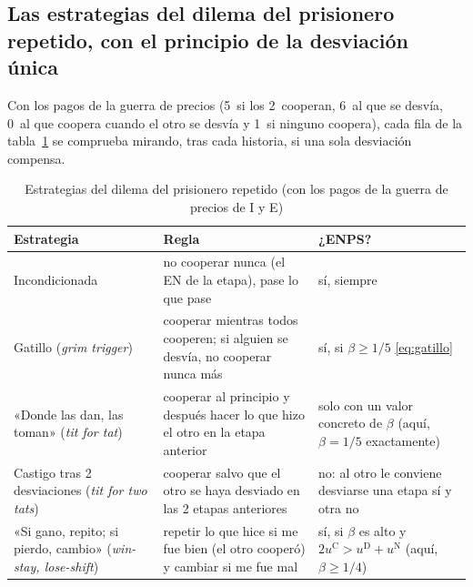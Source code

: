 \documentclass[11pt]{article}
\begin{document}
\subsection*{Las estrategias del dilema del prisionero repetido, con el principio de la desviación única}

Con los pagos de la guerra de precios (5~si los 2~cooperan, 6~al que se desvía, 0~al que coopera cuando el otro se desvía y 1~si ninguno coopera), cada fila de la tabla~\ref{tab:estrategias-repetidas} se comprueba mirando, tras cada historia, si una sola desviación compensa.

\begin{table}[H]
\centering
\caption{Estrategias del dilema del prisionero repetido (con los pagos de la guerra de precios de \textup{I} y E)}\label{tab:estrategias-repetidas}
\begin{tabular}{>{\raggedright\arraybackslash}m{3.8cm}>{\raggedright\arraybackslash}m{6.2cm}>{\centering\arraybackslash}m{4.4cm}}
\toprule
\rowcolor{tceeazulpalido}\textbf{Estrategia} & \textbf{Regla} & \textbf{¿ENPS?}\\
\midrule
Incondicionada & no cooperar nunca (el EN de la etapa), pase lo que pase & sí, siempre\\
\addlinespace[0.3em]
Gatillo (\emph{grim trigger}) & cooperar mientras todos cooperen; si alguien se desvía, no cooperar nunca más & sí, si $\beta\geq1/5$ \eqref{eq:gatillo}\\
\addlinespace[0.3em]
«Donde las dan, las toman» (\emph{tit for tat}) & cooperar al principio y después hacer lo que hizo el otro en la etapa anterior & solo con un valor concreto de $\beta$ (aquí, $\beta=1/5$ exactamente)\\
\addlinespace[0.3em]
Castigo tras 2 desviaciones (\emph{tit for two tats}) & cooperar salvo que el otro se haya desviado en las 2 etapas anteriores & no: al otro le conviene desviarse una etapa sí y otra no\\
\addlinespace[0.3em]
«Si gano, repito; si pierdo, cambio» (\emph{win-stay, lose-shift}) & repetir lo que hice si me fue bien (el otro cooperó) y cambiar si me fue mal & sí, si $\beta$ es alto y $2u^{\mathrm C}>u^{\mathrm D}+u^{\mathrm N}$ (aquí, $\beta\geq1/4$)\\
\bottomrule
\end{tabular}
\end{table}
\end{document}
